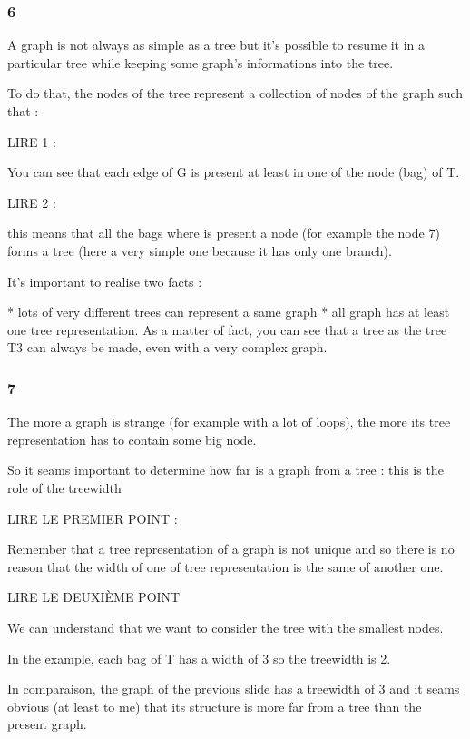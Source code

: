\documentclass[a4paper, 11pt,french]{article}
\begin{document}
\subsubsection*{ 6}

A graph is not always as simple as a tree but it's possible to resume it  in a particular tree while keeping some graph's informations into the tree. 

To do that, the nodes of the tree represent a collection of nodes of the graph such that : 

LIRE 1 :

 You can see that each edge of G is present at least in one of the node (bag) of T.

LIRE 2 :

 this means that all the bags where is present a node (for example the  node 7) forms a tree (here a very simple one because it has only one branch).

It's important to realise two facts : 

* lots of very different trees can represent a same graph
* all graph has at least one tree representation. As a matter of fact, you can see that a tree as the tree T3 can always be made, even with a very complex graph.


\subsubsection*{ 7}

The more a graph is strange (for example with a lot of loops), the more its tree representation has to contain some big node. 

So it seams important to determine how far is a graph from a tree : this is the role of the treewidth

LIRE LE PREMIER POINT :

 Remember that a tree representation of a graph is not unique and so  there is no reason that the width of one of tree representation is the same of another one. 

 
LIRE LE DEUXIÈME POINT

We can understand that we want to consider the tree with the smallest nodes. 

In the example, each bag of T has a width of 3 so the treewidth is 2. 

In comparaison, the graph of the previous slide has a treewidth of 3 and it seams obvious (at least to me) that its structure is more far from a tree than the present graph.
\end{document}
